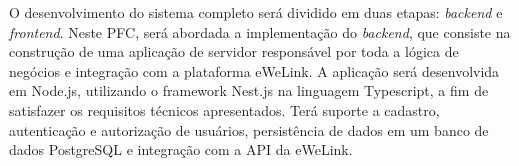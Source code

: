 O desenvolvimento do sistema completo será dividido em duas etapas: \textit{backend} e \textit{frontend}. Neste \acrlong{PFC}, será abordada a implementação do \textit{backend}, que consiste na construção de uma aplicação de servidor responsável por toda a lógica de negócios e integração com a plataforma eWeLink. A aplicação será desenvolvida em Node.js, utilizando o framework Nest.js na linguagem Typescript, a fim de satisfazer os requisitos técnicos apresentados. Terá suporte a cadastro, autenticação e autorização de usuários, persistência de dados em um banco de dados PostgreSQL e integração com a API da eWeLink.

